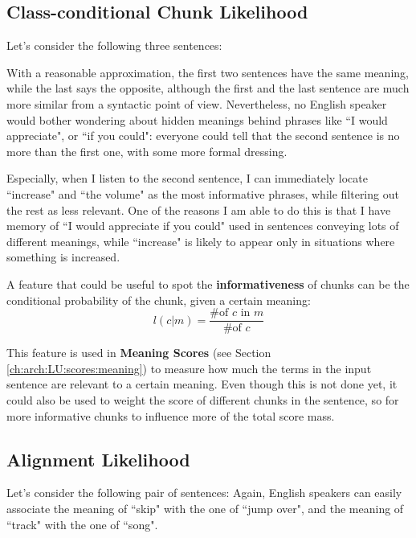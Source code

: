 \subsection{Class-conditional Chunk Likelihood} \label{ch3:ml:cc}
Let's consider the following three sentences:
\vspace{-0.7cm}
\vspace{-0.7cm}

With a reasonable approximation, the first two sentences have the same meaning, while the last says the opposite, although the first and the last sentence are much more similar from a syntactic point of view. Nevertheless, no English speaker would bother wondering about hidden meanings behind phrases like ``I would appreciate", or ``if you could": everyone could tell that the second sentence is no more than the first one, with some more formal dressing.

Especially, when I listen to the second sentence, I can immediately locate ``increase" and ``the volume" as the most informative phrases, while filtering out the rest as less relevant. One of the reasons I am able to do this is that I have memory of ``I would appreciate if you could" used in sentences conveying lots of different meanings, while ``increase" is likely to appear only in situations where something is increased.

A feature that could be useful to spot the \textbf{informativeness} of chunks can be the conditional probability of the chunk, given a certain meaning:
$$
l(c|m)=\frac{\text{\# of }c\text{ in }m}{\text{\# of }c}
$$

This feature is used in \textbf{Meaning Scores} (see Section \ref{ch:arch:LU:scores:meaning}) to measure how much the terms in the input sentence are relevant to a certain meaning. Even though this is not done yet, it could also be used to weight the score of different chunks in the sentence, so for more informative chunks to influence more of the total score mass.
\subsection{Alignment Likelihood}\label{ch3:ml:al}
Let's consider the following pair of sentences:
\vspace{-0.7cm}
Again, English speakers can easily associate the meaning of ``skip" with the one of ``jump over", and the meaning of ``track" with the one of ``song".

